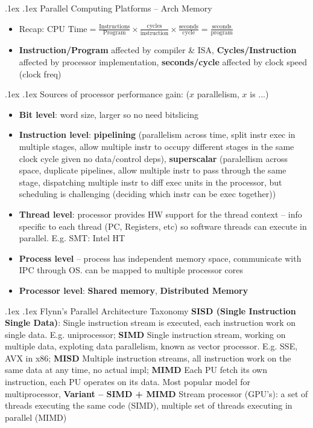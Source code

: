 \documentclass[10pt,landscape,a4paper]{article}
\makeatletter
\renewcommand{\section}{\@startsection{section}{1}{0mm}%
  {.1ex}%
  {.1ex}%
{\color{myblue}\sffamily\scriptsize\bfseries}}
\renewcommand{\subsection}{\@startsection{subsection}{1}{0mm}%
  {.1ex}%
  {.1ex}%
{\sffamily\bfseries}}
\makeatother
\begin{document}
\begin{multicols*}{4}
  \section{Parallel Computing Platforms -- Arch Memory}
  \begin{itemize}
    \item Recap: $\text{CPU Time} = \frac{\text{Instructions}}{\text{Program}}\times\frac{\text{cycles}}{\text{instruction}}\times\frac{\text{seconds}}{\text{cycle}} = \frac{\text{seconds}}{\text{program}}$
    \item \textbf{Instruction/Program} affected by compiler \& ISA, \textbf{Cycles/Instruction} affected by processor implementation, \textbf{seconds/cycle} affected by clock speed (clock freq)
  \end{itemize}
  \subsection{Sources of processor performance gain: ($x$ parallelism, $x$ is ...)}
  \begin{itemize}
    \item \textbf{Bit level}: word size, larger so no need bitslicing
    \item \textbf{Instruction level}: \textbf{pipelining} (parallelism across time, split instr exec in multiple stages, allow multiple instr to occupy different stages in the same clock cycle given no data/control deps), \textbf{superscalar} (paralellism across space, duplicate pipelines, allow multiple instr to pass through the same stage, dispatching multiple instr to diff exec units in the processor, but scheduling is challenging (deciding which instr can be exec together))
    \item \textbf{Thread level}: processor provides HW support for the thread context -- info specific to each thread (PC, Registers, etc) so software threads can execute in parallel. E.g. SMT: Intel HT
    \item \textbf{Process level} -- process has independent memory space, communicate with IPC through OS. can be mapped to multiple processor cores
    \item \textbf{Processor level}: \textbf{Shared memory}, \textbf{Distributed Memory}
  \end{itemize}
  \subsection{Flynn's Parallel Architecture Taxonomy}
  \textbf{SISD (Single Instruction Single Data)}: Single instruction stream is executed, each instruction work on single data. E.g. uniprocessor; \textbf{SIMD}
  Single instruction stream, working on multiple data, exploting data parallelism, known as vector processor. E.g. SSE, AVX in x86; \textbf{MISD}
  Multiple instruction streams, all instruction work on the same data at any time, no actual impl; \textbf{MIMD} Each PU fetch its own instruction, each PU operates on its data. Most popular model for multiprocessor, \textbf{Variant -- SIMD + MIMD}
  Stream processor (GPU's): a set of threads executing the same code (SIMD), multiple set of threads executing in parallel (MIMD)

\end{multicols*}
\end{document}

